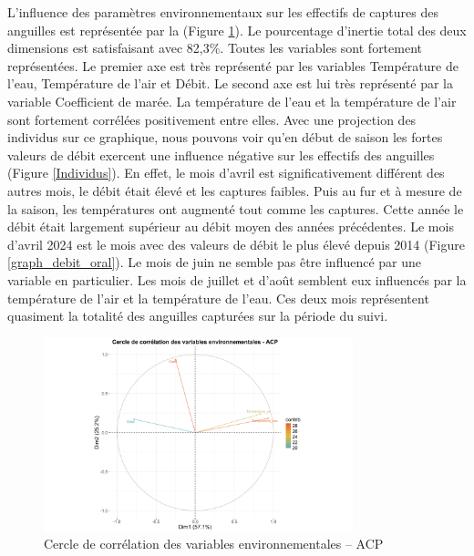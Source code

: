 \documentclass[11pt,titlepage,twoside]{article}\usepackage[]{graphicx}\usepackage[table]{xcolor}
\begin{document}
L’influence des paramètres environnementaux sur les effectifs de captures des anguilles est représentée par la (Figure \ref{ACP}). Le pourcentage d’inertie total des deux dimensions est satisfaisant avec 82,3\%. Toutes les variables sont fortement représentées. Le premier axe est très représenté par les variables Température de l’eau, Température de l’air et Débit. Le second axe est lui très représenté par la variable Coefficient de marée. La température de l’eau et la température de l’air sont fortement corrélées positivement entre elles. Avec une projection des individus sur ce graphique, nous pouvons voir qu’en début de saison les fortes valeurs de débit exercent une influence négative sur les effectifs des anguilles (Figure \ref{Individus}). En effet, le mois d’avril est significativement différent des autres mois, le débit était élevé et les captures faibles. Puis au fur et à mesure de la saison, les températures ont augmenté tout comme les captures. Cette année le débit était largement supérieur au débit moyen des années précédentes. Le mois d’avril 2024 est le mois avec des valeurs de débit le plus élevé depuis 2014 (Figure \ref{graph_debit_oral}). Le mois de juin ne semble pas être influencé par une variable en particulier. Les mois de juillet et d’août semblent eux influencés par la température de l’air et la température de l’eau. Ces deux mois représentent quasiment la totalité des anguilles capturées sur la période du suivi.

\begin{figure}[htpb]
\centering
\includegraphics[width=0.8\textwidth]{ACP.png}
\caption{Cercle de corrélation des variables environnementales – ACP}
\label{ACP}
\end{figure} 
\end{document}
